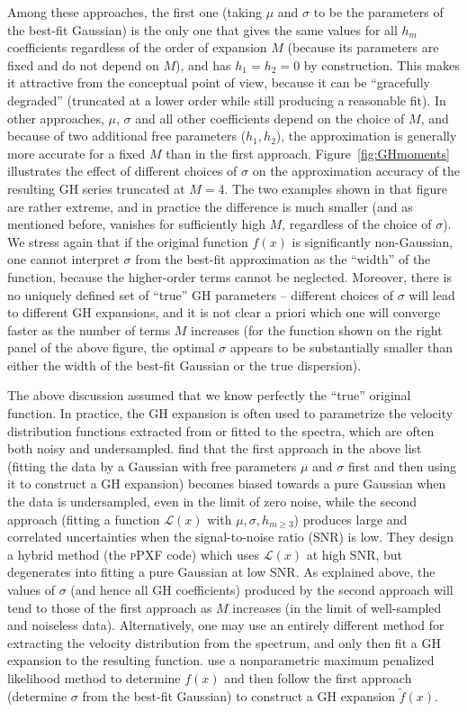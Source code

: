 \documentclass[12pt]{article}
\begin{document}
Among these approaches, the first one (taking $\mu$ and $\sigma$ to be the parameters of the best-fit Gaussian) is the only one that gives the same values for all $h_m$ coefficients regardless of the order of expansion $M$ (because its parameters are fixed and do not depend on $M$), and has $h_1=h_2=0$ by construction. This makes it attractive from the conceptual point of view, because it can be ``gracefully degraded'' (truncated at a lower order while still producing a reasonable fit). In other approaches, $\mu$, $\sigma$ and all other coefficients depend on the choice of $M$, and because of two additional free parameters ($h_1,h_2$), the approximation is generally more accurate for a fixed $M$ than in the first approach. Figure~\ref{fig:GHmoments} illustrates the effect of different choices of $\sigma$ on the approximation accuracy of the resulting GH series truncated at $M=4$. The two examples shown in that figure are rather extreme, and in practice the difference is much smaller (and as mentioned before, vanishes for sufficiently high $M$, regardless of the choice of $\sigma$).
We stress again that if the original function $f(x)$ is significantly non-Gaussian, one cannot interpret $\sigma$ from the best-fit approximation as the ``width'' of the function, because the higher-order terms cannot be neglected. Moreover, there is no uniquely defined set of ``true'' GH parameters -- different choices of $\sigma$ will lead to different GH expansions, and it is not clear a priori which one will converge faster as the number of terms $M$ increases (for the function shown on the right panel of the above figure, the optimal $\sigma$ appears to be substantially smaller than either the width of the best-fit Gaussian or the true dispersion).

The above discussion assumed that we know perfectly the ``true'' original function. In practice, the GH expansion is often used to parametrize the velocity distribution functions extracted from or fitted to the spectra, which are often both noisy and undersampled.
\cite{CappellariEmsellem2004} find that the first approach in the above list (fitting the data by a Gaussian with free parameters $\mu$ and $\sigma$ first and then using it to construct a GH expansion) becomes biased towards a pure Gaussian when the data is undersampled, even in the limit of zero noise, while the second approach (fitting a function $\mathscr L(x)$ with $\mu,\sigma,h_{m\ge 3}$) produces large and correlated uncertainties when the signal-to-noise ratio (SNR) is low. They design a hybrid method (the \textsc{pPXF} code) which uses $\mathscr L(x)$ at high SNR, but degenerates into fitting a pure Gaussian at low SNR. As explained above, the values of $\sigma$ (and hence all GH coefficients) produced by the second approach will tend to those of the first approach as $M$ increases (in the limit of well-sampled and noiseless data).
Alternatively, one may use an entirely different method for extracting the velocity distribution from the spectrum, and only then fit a GH expansion to the resulting function. \cite{Joseph2001} use a nonparametric maximum penalized likelihood method to determine $f(x)$ and then follow the first approach (determine $\sigma$ from the best-fit Gaussian) to construct a GH expansion $\tilde f(x)$.
\end{document}
